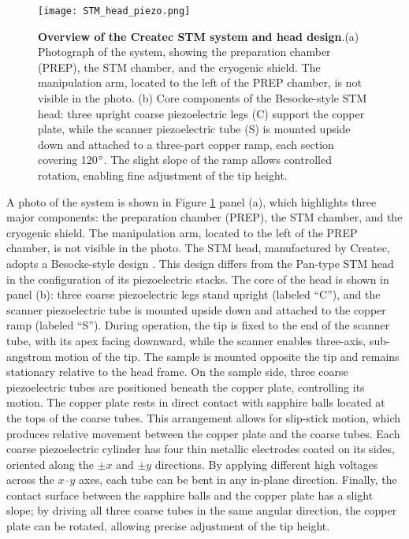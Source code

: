 \begin{figure}
	\centering
	\texttt{[image: STM\_head\_piezo.png]}
	\caption[\textbf{Overview of the Createc STM system and head design}]{\textbf{Overview of the Createc STM system and head design}.(a) Photograph of the system, showing the preparation chamber (PREP), the STM chamber, and the cryogenic shield. The manipulation arm, located to the left of the PREP chamber, is not visible in the photo. (b) Core components of the Besocke-style STM head: three upright coarse piezoelectric legs (C) support the copper plate, while the scanner piezoelectric tube (S) is mounted upside down and attached to a three-part copper ramp, each section covering 120$\degree$. The slight slope of the ramp allows controlled rotation, enabling fine adjustment of the tip height.}
	\label{fig:STM_head}
\end{figure}

A photo of the system is shown in Figure \ref{fig:STM_head} panel (a), which highlights three major components: the preparation chamber (PREP), the STM chamber, and the cryogenic shield. The manipulation arm, located to the left of the PREP chamber, is not visible in the photo. The STM head, manufactured by Createc, adopts a Besocke-style design \cite{besockeEasilyOperableScanning1987b}. This design differs from the Pan-type STM head in the configuration of its piezoelectric stacks. The core of the head is shown in panel (b): three coarse piezoelectric legs stand upright (labeled “C”), and the scanner piezoelectric tube is mounted upside down and attached to the copper ramp (labeled “S”). During operation, the tip is fixed to the end of the scanner tube, with its apex facing downward, while the scanner enables three-axis, sub-angstrom motion of the tip. The sample is mounted opposite the tip and remains stationary relative to the head frame. On the sample side, three coarse piezoelectric tubes are positioned beneath the copper plate, controlling its motion. The copper plate rests in direct contact with sapphire balls located at the tops of the coarse tubes. This arrangement allows for slip-stick motion, which produces relative movement between the copper plate and the coarse tubes. Each coarse piezoelectric cylinder has four thin metallic electrodes coated on its sides, oriented along the $\pm x$ and $\pm y$ directions. By applying different high voltages across the $x$–$y$ axes, each tube can be bent in any in-plane direction. Finally, the contact surface between the sapphire balls and the copper plate has a slight slope; by driving all three coarse tubes in the same angular direction, the copper plate can be rotated, allowing precise adjustment of the tip height.

